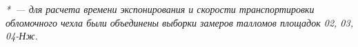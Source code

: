 \begin{table}[H]
\begin{center}
\begin{tabular}{ccccccc}
                          \bottomrule
 \end{tabular}
\end{center}
\textit{*~--- для расчета времени экспонирования и скорости транспортировки обломочного чехла были объединены выборки замеров талломов площадок 02, 03, 04-Нж.}

 \end{table}
